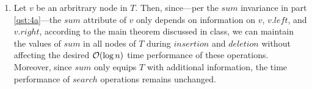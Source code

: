 \documentclass{article}
\begin{document}
\begin{enumerate}[leftmargin={*}, font={\bf}, label={\arabic*.}, ref={\arabic*}]
\begin{enumerate}[ref={(\alph*)}]
      \item \label{qst:4c}
        Let $v$ be an arbritrary node in $T$. Then, since---per the $sum$ invariance in part
        \ref{qst:4a}---the $sum$ attribute of $v$ only depends on information on $v$, $v.left$, and
        $v.right$, according to the main theorem discussed in class, we can maintain the values of
        $sum$ in all nodes of $T$ during $insertion$ and $deletion$ without affecting the desired
        $\operatorname*{\mathcal{O}}(\log n)$ time performance of these operations. Moreover, since $sum$ only equips $T$
        with additional information, the time performance of $search$ operations remains unchanged.

    \end{enumerate}
\end{enumerate}
\end{document}
